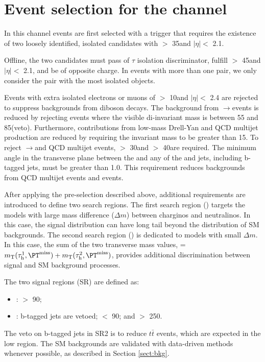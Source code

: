 \section{\texorpdfstring{Event selection for the \tauTau channel}{Event selection for the tau-tau channel}}
\label{sect:tauTauCuts}
In this channel events are first selected with a trigger \cite{Khachatryan:2015hwa,Chatrchyan:2012xi,Chatrchyan:2011nv}
that requires the existence of
two loosely identified, isolated \Tau candidates with \PT $>$ 35\GeV and $|\eta|<$ 2.1.   

Offline, the two \Tau candidates must pass \cite{Khachatryan:2015dfa} of $\tau$ isolation discriminator, 
fulfill \PT $>$ 45\GeV and $|\eta|<$ 2.1, and be of opposite charge.
In events with more than one \tauTau pair, we only consider the pair with the most isolated \Tau objects. 

Events with extra isolated electrons or muons of \PT $>$ 10\GeV and $|\eta| <$ 2.4 
are rejected to suppress %
backgrounds from diboson decays.
The background from \Z$\rightarrow$\tauTau events is reduced by rejecting events where the visible
di-\Tau invariant mass is between 55 and 85\GeV (\Z veto).  
Furthermore, contributions from low-mass Drell-Yan and QCD multijet production are 
reduced by requiring the invariant mass to be greater than 15\GeV.
To reject \Z$\rightarrow$\tauTau and QCD multijet events, %
\MPT $>$ 30\GeV and \mttwo $>$ 40\GeV are required.
The minimum angle \deltaphi in the transverse plane between the \ptvecmiss and any of the \Tau and jets, 
including b-tagged jets, must be greater than 1.0. 
This requirement reduces backgrounds from QCD multijet events and \wjets events.

After applying the pre-selection described above,
additional requirements are introduced to define two search regions.
The first search region (\binone) targets the models with large mass difference ($\Delta m$) 
between charginos and neutralinos.
In this case, the \mttwo signal distribution can have long tail beyond the 
distribution of SM backgrounds.
The second search region (\bintwo) is dedicated to models with small $\Delta m$.  
In this case, the sum of the two transverse mass values, \SumMT = $\mt(\Tau^1,\MPT) + \mt(\Tau^2,\MPT)$, 
provides additional discrimination between signal and SM background processes.

The two signal regions (SR) are defined as:
\begin{itemize}
\item {\bf \binone}: \mttwo $>$ 90\GeV;
\item {\bf \bintwo}: b-tagged jets are vetoed; \mttwo $<$ 90\GeV; and \SumMT $>$ 250\GeV.
\end{itemize}
The veto on b-tagged jets in SR2 is  to reduce
$t\bar{t}$ events, which
are expected in  the low \mttwo region. 
The SM backgrounds are validated with data-driven methods whenever possible, as described in Section \ref{sect:bkg}.

